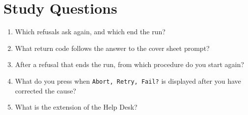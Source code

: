 \section{Study Questions}
\begin{enumerate}
\item Which refusals ask again, and which end the run?
\item What return code follows the answer  to the cover sheet
  prompt?
\item After a refusal that ends the run, from which procedure do you start
  again?
\item What do you press when \texttt{Abort, Retry, Fail?} is displayed after
  you have corrected the cause?
\item What is the extension of the Help Desk?
\end{enumerate}
